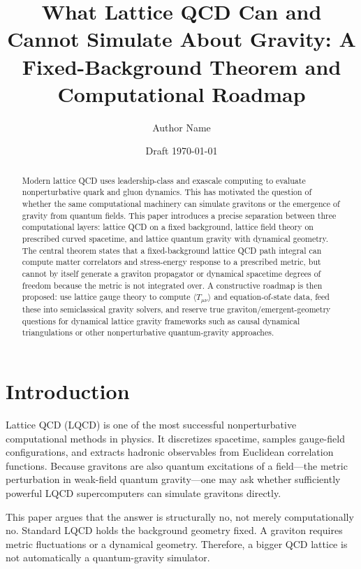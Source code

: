 \documentclass[11pt]{article}
\title{What Lattice QCD Can and Cannot Simulate About Gravity: A Fixed-Background Theorem and Computational Roadmap}
\author{Author Name}
\affil{Independent Research Draft}
\date{Draft \today}
\theoremstyle{remark}
\begin{document}
\maketitle

\begin{abstract}
Modern lattice QCD uses leadership-class and exascale computing to evaluate nonperturbative quark and gluon dynamics. This has motivated the question of whether the same computational machinery can simulate gravitons or the emergence of gravity from quantum fields. This paper introduces a precise separation between three computational layers: lattice QCD on a fixed background, lattice field theory on prescribed curved spacetime, and lattice quantum gravity with dynamical geometry. The central theorem states that a fixed-background lattice QCD path integral can compute matter correlators and stress-energy response to a prescribed metric, but cannot by itself generate a graviton propagator or dynamical spacetime degrees of freedom because the metric is not integrated over. A constructive roadmap is then proposed: use lattice gauge theory to compute $\langle T_{\mu\nu}\rangle$ and equation-of-state data, feed these into semiclassical gravity solvers, and reserve true graviton/emergent-geometry questions for dynamical lattice gravity frameworks such as causal dynamical triangulations or other nonperturbative quantum-gravity approaches.
\end{abstract}

\tableofcontents

\section{Introduction}

Lattice QCD (LQCD) is one of the most successful nonperturbative computational methods in physics. It discretizes spacetime, samples gauge-field configurations, and extracts hadronic observables from Euclidean correlation functions. Because gravitons are also quantum excitations of a field---the metric perturbation in weak-field quantum gravity---one may ask whether sufficiently powerful LQCD supercomputers can simulate gravitons directly.

This paper argues that the answer is structurally no, not merely computationally no. Standard LQCD holds the background geometry fixed. A graviton requires metric fluctuations or a dynamical geometry. Therefore, a bigger QCD lattice is not automatically a quantum-gravity simulator.
\end{document}
